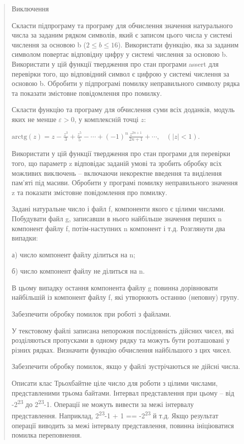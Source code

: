 \documentclass[]{article}
\begin{document}
\begin{quote}
Виключення

\protect\hypertarget{_Hlk65951733}{}{}Скласти підпрограму та програму
для обчислення значення натурального числа за заданим рядком символів,
який є записом цього числа у системі числення за основою b
(\(2 \leq b \leq 16\)). Використати функцію, яка за заданим символом
повертає відповідну цифру у системі числення за основою b. Використати у
цій функції твердження про стан програми assert для перевірки того, що
відповідний символ є цифрою у системі числення за основою b. Обробити у
підпрограмі помилку неправильного символу рядка та показати змістовне
повідомлення про помилку.

Скласти функцію та програму для обчислення суми всіх доданків, модуль
яких не менше $\varepsilon >0$, у комплексній точці $z$:

\(\text{arctg}\left( z \right) = z - \frac{z^{3}}{3} + \frac{z^{5}}{5} - \cdots + {( - 1)}^{n}\frac{z^{2n + 1}}{2n + 1} + \cdots,\ \ \ \ (\left| z \right| < 1)\).

Використати у цій функції твердження про стан програми для перевірки
того, що параметр z відповідає заданій умові та зробить обробку всіх
можливих виключень -- включаючи некоректне введення та виділення пам'яті
під масиви. Обробити у програмі помилку неправильного значення z та
показати змістовне повідомлення про помилку.

Задані натуральне число і файл f, компоненти якого є цілими числами.
Побудувати файл g, записавши в нього найбільше значення перших n
компонент файлу f, потім-наступних n компонент і т.д. Розглянути два
випадки:

а) число компонент файлу ділиться на n;

б) число компонент файлу не ділиться на n.

В цьому випадку остання компонента файлу g повинна дорівнювати
найбільшій із компонент файлу f, які утворюють останню (неповну) групу.

Забезпечити обробку помилок при роботі з файлами.

У текстовому файлі записана непорожня послідовність дійсних чисел, які
розділяються пропусками в одному рядку та можуть бути розташовані у
різних рядках. Визначити функцію обчислення найбільшого з цих чисел.

Забезпечити обробку помилок, якщо у файлі зустрічаються не дійсні числа.

Описати клас Трьохбайтне ціле число для роботи з цілими числами,
представленими трьома байтами. Інтервал представлення при цьому -- від
-2\textsuperscript{23} до 2\textsuperscript{23}-1. Операції не можуть
вивести за межі інтервалу представлення. Наприклад,
2\textsuperscript{23}-1 + 1 == -2\textsuperscript{23} й т.д. Якщо
результат операції виводить за межі інтервалу представлення, повинна
ініціюватися помилка переповнення.


\end{quote}
\end{document}
